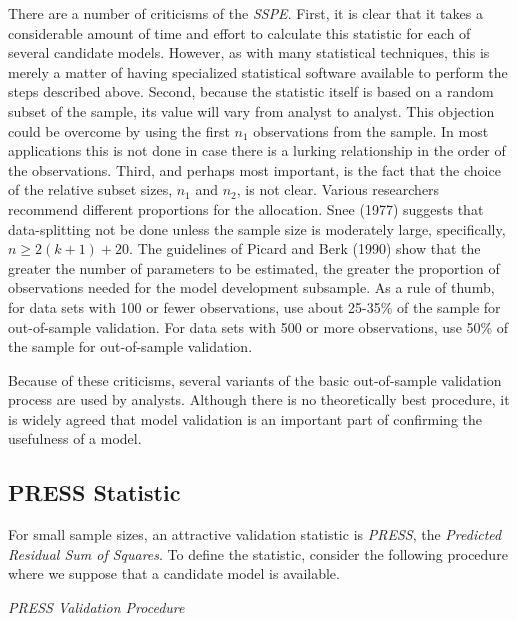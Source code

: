 There are a number of criticisms of the \textit{SSPE}. First, it is clear
that it takes a considerable amount of time and effort to calculate this
statistic for each of several candidate models. However, as with many
statistical techniques, this is merely a matter of having specialized
statistical software available to perform the steps described above. Second,
because the statistic itself is based on a random subset of the sample, its
value will vary from analyst to analyst. This objection could be overcome by
using the first $n_{1}$ observations from the sample. In most applications
this is not done in case there is a lurking relationship in the order of the
observations. Third, and perhaps most important, is the fact that the choice
of the relative subset sizes, $n_{1}$ and $n_{2}$, is not clear. Various
researchers recommend different proportions for the allocation. Snee (1977)
suggests that data-splitting not be done unless the sample size is
moderately large, specifically, $n\geq 2(k+1)+20$. The guidelines of Picard
and Berk (1990) show that the greater the number of parameters to be
estimated, the greater the proportion of observations needed for the model
development subsample. As a rule of thumb, for data sets with 100 or fewer
observations, use about 25-35\% of the sample for out-of-sample validation.
For data sets with 500 or more observations, use 50\% of the sample for
out-of-sample validation.

Because of these criticisms, several variants of the basic out-of-sample
validation process are used by analysts. Although there is no theoretically
best procedure, it is widely agreed that model validation is an important
part of confirming the usefulness of a model.

\subsection{PRESS Statistic}

For small sample sizes, an attractive validation statistic is
\textit{PRESS}, the \textit{Predicted Residual Sum of Squares}. To
define the statistic, consider the following procedure where we
suppose that a candidate model is available.

\bigskip
\boxedjed

\textit{PRESS Validation Procedure}

